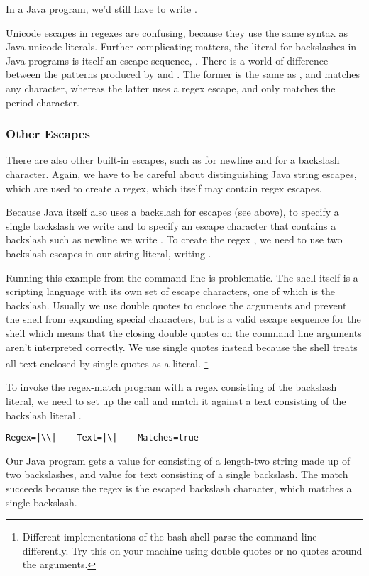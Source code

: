 In a Java program, we'd still have to write
.  

Unicode escapes in regexes are confusing, because they use the same
syntax as Java unicode literals.  Further complicating matters, the
literal for backslashes in Java programs is itself an escape sequence,
\code{{\bk}{\bk}}.  There is a world of difference between the
patterns produced by  and
.  The former is the same
as , and matches any character, whereas
the latter uses a regex escape, and only matches the period
character.

\subsubsection{Other Escapes}

There are also other built-in escapes, such as  for
newline and \code{\bk\bk} for a backslash character.  Again, we have
to be careful about distinguishing Java string escapes, which are used
to create a regex, which itself may contain regex escapes.  

Because Java itself also uses a backslash for escapes (see above),
to specify a single backslash we write \code{\bk\bk} and 
to specify an escape character that contains a backslash such as newline 
 we write .  To create the regex \code{\bk\bk}, 
we need to use two backslash escapes in our string literal, writing
.  

Running this example from the command-line is problematic.
The shell itself is a scripting language with its own set of
escape characters, one of which is the backslash.
Usually we use double quotes to enclose the arguments and prevent
the shell from expanding special characters, but  is a valid escape
sequence for the shell which means that the closing double quotes on the
command line arguments aren't interpreted correctly.
We use single quotes instead because
the shell treats all text enclosed by single quotes as a literal.%
%
\footnote{Different implementations of the bash shell
parse the command line differently.  Try this on your machine
using double quotes or no quotes around the arguments.}

To invoke the regex-match program with a regex consisting 
of the backslash literal, we need to set up the call 
and match it against a text consisting of the backslash literal \code{\bk\bk}.
%
%
\begin{verbatim}
Regex=|\\|    Text=|\|    Matches=true
\end{verbatim}
%
Our Java program gets a value for  consisting of a
length-two string made up of two backslashes, and value for text
consisting of a single backslash.  The match succeeds because the
regex \code{\bk\bk} is the escaped backslash character, which matches
a single backslash.



